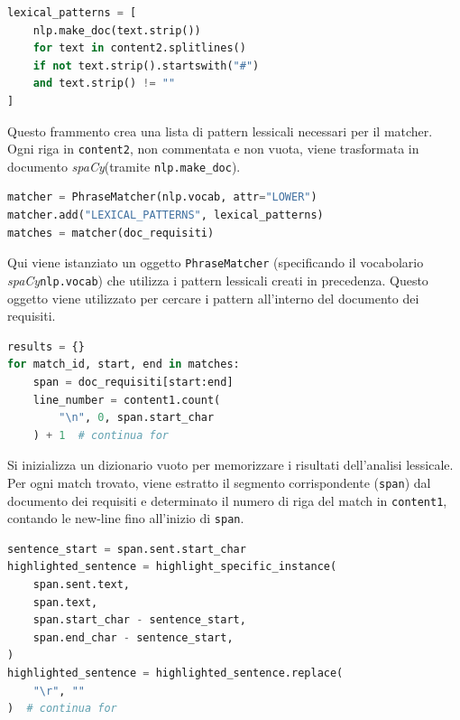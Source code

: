 \documentclass[12pt]{report}
\newcommand{\spacy}{\textsl{spaCy}\xspace}
\begin{document}
\begin{mdframed}
\small
\begin{lstlisting}[language=Python]
lexical_patterns = [
    nlp.make_doc(text.strip())
    for text in content2.splitlines()
    if not text.strip().startswith("#")
    and text.strip() != ""
]
\end{lstlisting}
\end{mdframed}

\noindent Questo frammento crea una lista di pattern lessicali necessari per il matcher. Ogni riga in \texttt{content2}, non commentata e non vuota, viene trasformata in documento \spacy (tramite \texttt{nlp.make\_doc}).


\begin{mdframed}
\small
\begin{lstlisting}[language=Python]
matcher = PhraseMatcher(nlp.vocab, attr="LOWER")
matcher.add("LEXICAL_PATTERNS", lexical_patterns)
matches = matcher(doc_requisiti)
\end{lstlisting}
\end{mdframed}

\noindent Qui viene istanziato un oggetto \texttt{PhraseMatcher} (specificando il vocabolario \spacy \texttt{nlp.vocab}) che utilizza i pattern lessicali creati in precedenza. Questo oggetto viene utilizzato per cercare i pattern all'interno del documento dei requisiti.


\begin{mdframed}
\small
\begin{lstlisting}[language=Python]
results = {}
for match_id, start, end in matches:
    span = doc_requisiti[start:end]
    line_number = content1.count(
        "\n", 0, span.start_char
    ) + 1  # continua for
\end{lstlisting}
\end{mdframed}

\noindent Si inizializza un dizionario vuoto per memorizzare i risultati dell'analisi lessicale. Per ogni match trovato, viene estratto il segmento corrispondente (\texttt{span}) dal documento dei requisiti e determinato il numero di riga del match in \texttt{content1}, contando le new-line fino all'inizio di \texttt{span}.


\begin{mdframed}
\small
\begin{lstlisting}[language=Python]
sentence_start = span.sent.start_char
highlighted_sentence = highlight_specific_instance(
    span.sent.text,
    span.text,
    span.start_char - sentence_start,
    span.end_char - sentence_start,
)
highlighted_sentence = highlighted_sentence.replace(
    "\r", ""
)  # continua for
\end{lstlisting}
\end{mdframed}
\end{document}
